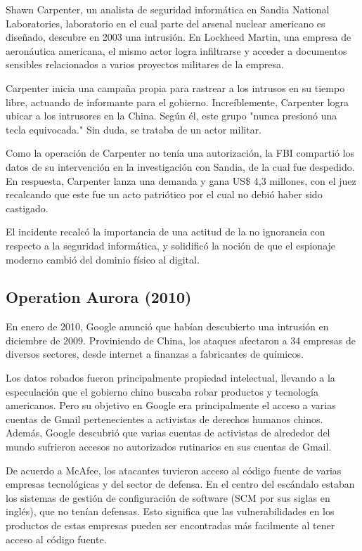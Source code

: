 \documentclass{article}
\begin{document}
Shawn Carpenter, un analista de seguridad informática en Sandia National Laboratories, laboratorio en el cual parte del arsenal nuclear americano es diseñado, descubre en 2003 una intrusión. En Lockheed Martin, una empresa de aeronáutica americana, el mismo actor logra infiltrarse y acceder a documentos sensibles relacionados a varios proyectos militares de la empresa.

Carpenter inicia una campaña propia para rastrear a los intrusos en su tiempo libre, actuando de informante para el gobierno. Increíblemente, Carpenter logra ubicar a los intrusores en la China. Según él, este grupo "nunca presionó una tecla equivocada." Sin duda, se trataba de un actor militar.\autocite{time-titan-rain} \autocite{homelandsecurity-titan-rain}

Como la operación de Carpenter no tenía una autorización, la FBI compartió los datos de su intervención en la investigación con Sandia, de la cual fue despedido. En respuesta, Carpenter lanza una demanda y gana US\$ 4,3 millones, con el juez recalcando que este fue un acto patriótico por el cual no debió haber sido castigado.

El incidente recalcó la importancia de una actitud de la no ignorancia con respecto a la seguridad informática, y solidificó la noción de que el espionaje moderno cambió del dominio físico al digital. \autocite{computerworld-titan-rain}

\subsection{Operation Aurora (2010)}
En enero de 2010, Google anunció que habían descubierto una intrusión en diciembre de 2009. Proviniendo de China, los ataques afectaron a 34 empresas de diversos sectores, desde internet a finanzas a fabricantes de químicos. 

Los datos robados fueron principalmente propiedad intelectual, llevando a la especulación que el gobierno chino buscaba robar productos y tecnología americanos. Pero su objetivo en Google era principalmente el acceso a varias cuentas de Gmail pertenecientes a activistas de derechos humanos chinos. Además, Google descubrió que varias cuentas de activistas de alrededor del mundo sufrieron accesos no autorizados rutinarios en sus cuentas de Gmail. \autocite{google-aurora}

De acuerdo a McAfee, los atacantes tuvieron acceso al código fuente de varias empresas tecnológicas y del sector de defensa. En el centro del escándalo estaban los sistemas de gestión de configuración de software (SCM por sus siglas en inglés), que no tenían defensas. Esto significa que las vulnerabilidades en los productos de estas empresas pueden ser encontradas más facilmente al tener acceso al código fuente. \autocite{wired-aurora}
\end{document}
